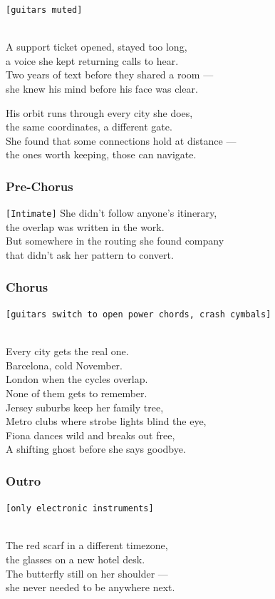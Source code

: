 \documentclass[]{article}
\begin{document}
\texttt{{[}guitars\ muted{]}}\strut \\
A support ticket opened, stayed too long,\\
a voice she kept returning calls to hear.\\
Two years of text before they shared a room ---\\
she knew his mind before his face was clear.

His orbit runs through every city she does,\\
the same coordinates, a different gate.\\
She found that some connections hold at distance ---\\
the ones worth keeping, those can navigate.

\subsubsection{Pre-Chorus}\label{pre-chorus-21}

\texttt{{[}Intimate{]}} She didn't follow anyone's itinerary,\\
the overlap was written in the work.\\
But somewhere in the routing she found company\\
that didn't ask her pattern to convert.

\subsubsection{Chorus}\label{chorus-36}

\texttt{{[}guitars\ switch\ to\ open\ power\ chords,\ crash\ cymbals{]}}\strut \\
Every city gets the real one.\\
Barcelona, cold November.\\
London when the cycles overlap.\\
None of them gets to remember.\\
Jersey suburbs keep her family tree,\\
Metro clubs where strobe lights blind the eye,\\
Fiona dances wild and breaks out free,\\
A shifting ghost before she says goodbye.

\subsubsection{Outro}\label{outro-6}

\texttt{{[}only\ electronic\ instruments{]}}\strut \\
The red scarf in a different timezone,\\
the glasses on a new hotel desk.\\
The butterfly still on her shoulder ---\\
she never needed to be anywhere next.
\end{document}

